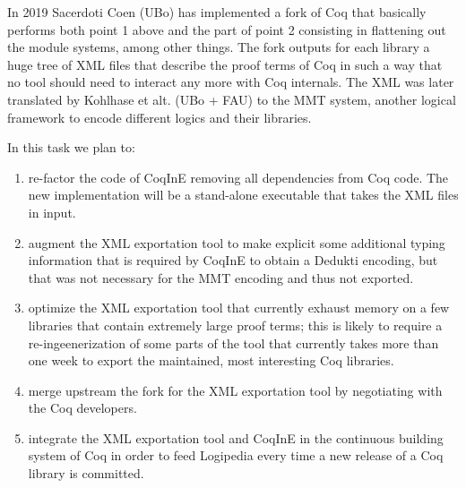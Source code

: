 In 2019 Sacerdoti Coen (UBo) has implemented a fork of Coq that basically performs both point 1 above and the part of point 2 consisting in flattening out the module systems, among other things. The fork outputs for each library a huge tree of XML files that describe the proof terms of Coq in such a way that no tool should need to interact any more with Coq internals. The XML was later translated by Kohlhase et alt. (UBo + FAU) to the MMT system, another logical framework to encode different logics and their libraries.

In this task we plan to:
\begin{enumerate}
 \item re-factor the code of CoqInE removing all dependencies from Coq code. The new implementation will be a stand-alone executable that takes the XML files in input.
 \item augment the XML exportation tool to make explicit some additional typing information that is required by CoqInE to obtain a Dedukti encoding, but that was not necessary for the MMT encoding and thus not exported.
 \item optimize the XML exportation tool that currently exhaust memory on a few libraries that contain extremely large proof terms; this is likely to require a re-ingeenerization of some parts of the tool that currently takes more than one week to export the maintained, most interesting Coq libraries.
 \item merge upstream the fork for the XML exportation tool by negotiating with the Coq developers.
 \item integrate the XML exportation tool and CoqInE in the continuous building system of Coq in order to feed Logipedia every time a new release of a Coq library is committed.
\end{enumerate}

